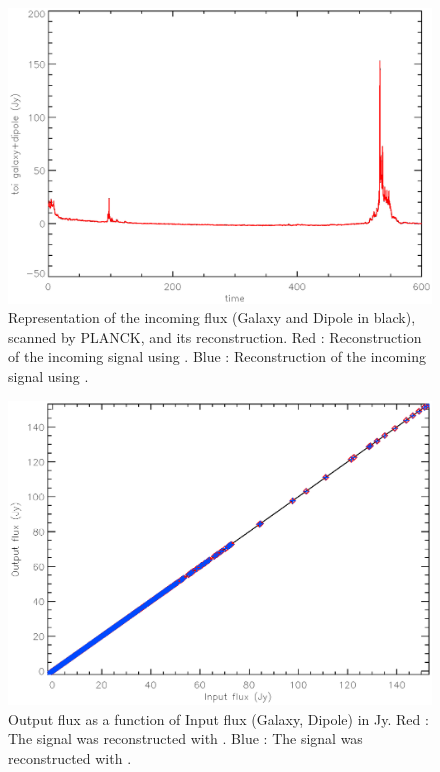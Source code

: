 \begin{figure}[h]
\center
	\includegraphics[scale=0.5]{Figures/toi-galaxy-dipole-planck.eps}
	\caption{Representation of the incoming flux (Galaxy and Dipole in black), scanned by PLANCK, and its reconstruction. Red : Reconstruction of the incoming signal using \cf. Blue : Reconstruction of the incoming signal using \rf.
}
	\label{fig:toi-galaxy-dipole-planck}
\end{figure}

\begin{figure}[h]
\center
	\includegraphics[scale=0.5]{Figures/NL-galaxy-dipole-planck.eps}
	\caption{Output flux as a function of Input flux (Galaxy, Dipole) in Jy. Red : The signal was reconstructed with \cf. Blue : The signal was reconstructed with \rf.}
	\label{fig:nl-galaxy-dipole-planck}
\end{figure}

